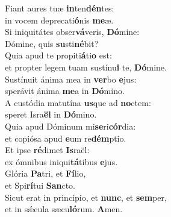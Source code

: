\evenverse Fiant aures tuæ \textbf{in}ten\textbf{dén}tes:~\*\\
\evenverse in vocem deprecati\textbf{ó}nis \textbf{me}æ.\\
\oddverse Si iniquitátes obser\textbf{vá}veris, \textbf{Dó}mine:~\*\\
\oddverse Dómine, quis \textbf{su}sti\textbf{né}bit?\\
\evenverse Quia apud te propiti\textbf{á}ti\textbf{o} est:~\*\\
\evenverse et propter legem tuam sustínu\textbf{i} te, \textbf{Dó}mine.\\
\oddverse Sustínuit ánima mea in \textbf{ver}bo \textbf{e}jus:~\*\\
\oddverse sperávit ánima \textbf{me}a in \textbf{Dó}mino.\\
\evenverse A custódia matutína \textbf{us}que ad \textbf{no}ctem:~\*\\
\evenverse speret Isra\textbf{ël} in \textbf{Dó}mino.\\
\oddverse Quia apud Dóminum mi\textbf{se}ri\textbf{cór}dia:~\*\\
\oddverse et copiósa apud \textbf{e}um re\textbf{dém}ptio.\\
\evenverse Et ipse \textbf{ré}dimet \textbf{Is}raël:~\*\\
\evenverse ex ómnibus iniqui\textbf{tá}tibus \textbf{e}jus.\\
\oddverse Glória \textbf{Pa}tri, et \textbf{Fí}lio,~\*\\
\oddverse et Spi\textbf{rí}tui \textbf{San}cto.\\
\evenverse Sicut erat in princípio, et \textbf{nunc}, et \textbf{sem}per,~\*\\
\evenverse et in sǽcula sæcu\textbf{ló}rum. \textbf{A}men.\\
